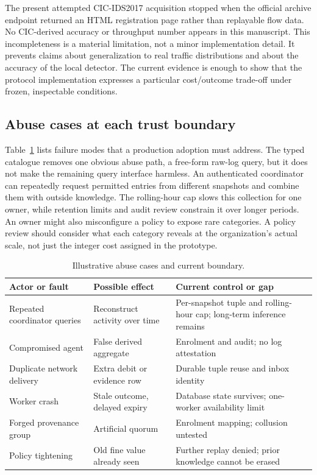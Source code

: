 The present attempted CIC-IDS2017 acquisition stopped when the official archive endpoint returned an HTML registration page rather than replayable flow data. No CIC-derived accuracy or throughput number appears in this manuscript. This incompleteness is a material limitation, not a minor implementation detail. It prevents claims about generalization to real traffic distributions and about the accuracy of the local detector. The current evidence is enough to show that the protocol implementation expresses a particular cost/outcome trade-off under frozen, inspectable conditions.

\subsection{Abuse cases at each trust boundary}
Table~\ref{tab:abuse} lists failure modes that a production adoption must address. The typed catalogue removes one obvious abuse path, a free-form raw-log query, but it does not make the remaining query interface harmless. An authenticated coordinator can repeatedly request permitted entries from different snapshots and combine them with outside knowledge. The rolling-hour cap slows this collection for one owner, while retention limits and audit review constrain it over longer periods. An owner might also misconfigure a policy to expose rare categories. A policy review should consider what each category reveals at the organization's actual scale, not just the integer cost assigned in the prototype.

\begin{table}[t]
\centering\caption{Illustrative abuse cases and current boundary.}
\label{tab:abuse}\scriptsize\setlength{\tabcolsep}{2pt}
\begin{tabular}{p{}p{}p{}}\hline
Actor or fault & Possible effect & Current control or gap \\\hline
Repeated coordinator queries & Reconstruct activity over time & Per-snapshot tuple and rolling-hour cap; long-term inference remains\\
Compromised agent & False derived aggregate & Enrolment and audit; no log attestation\\
Duplicate network delivery & Extra debit or evidence row & Durable tuple reuse and inbox identity\\
Worker crash & Stale outcome, delayed expiry & Database state survives; one-worker availability limit\\
Forged provenance group & Artificial quorum & Enrolment mapping; collusion untested\\
Policy tightening & Old fine value already seen & Further replay denied; prior knowledge cannot be erased\\\hline
\end{tabular}
\end{table}


